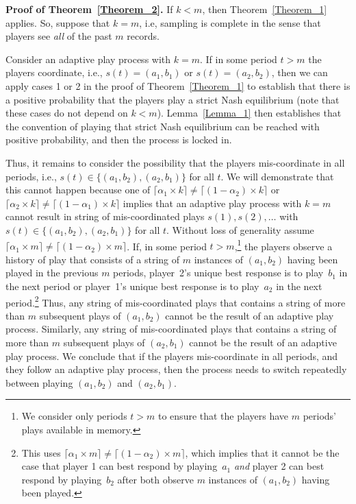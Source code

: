 \textbf{Proof of Theorem~\ref{Theorem_2}.}
If $k<m$, then Theorem~\ref{Theorem_1} applies. So, suppose that $k=m$, i.e, sampling is complete in the sense that players see \emph{all} of the past $m$ records.

Consider an adaptive play process with $k=m$. If in some period $t>m$ the players coordinate, i.e., $s(t)=(a_1,b_1)$ or $s(t)=(a_2,b_2)$, then we can apply cases 1 or 2 in the proof of Theorem~\ref{Theorem_1} to establish that there is a positive probability that the players play a strict Nash equilibrium (note that these cases do not depend on $k < m$). 
Lemma~\ref{Lemma_1} then establishes that the convention of playing that strict Nash equilibrium can be reached with positive probability, and then the process is locked in.

Thus, it remains to consider the possibility that the players mis-coordinate in all periods, i.e., $s(t)\in \{(a_1,b_2),(a_2,b_1)\}$ for all $t$. We will demonstrate that this cannot happen because one of $\lceil\alpha_1\times k\rceil \neq \lceil (1-\alpha_2)\times k\rceil$ or $\lceil\alpha_2\times k\rceil \neq \lceil (1-\alpha_1)\times k\rceil$ implies that an adaptive play process with $k=m$ cannot result in string of mis-coordinated plays $s(1),s(2), \ldots $ with $s(t)\in \{(a_1,b_2),(a_2,b_1)\}$ for all $t$. 
%
Without loss of generality assume $\lceil \alpha_1\times m\rceil \neq\lceil (1-\alpha_2)\times m\rceil$. If, in some period $t>m$,\footnote{We consider only periods $t>m$ to ensure that the players have $m$ periods' plays available in memory.} the players observe a history of play that consists of a string of $m$ instances of $(a_1,b_2)$ having been played in the previous $m$ periods, player~2's unique best response is to play~$b_1$ in the next period or player~1's unique best response is to play~$a_2$ in the next period.\footnote{This uses $\lceil \alpha_1\times m\rceil \neq\lceil (1-\alpha_2)\times m\rceil$, which implies that it cannot be the case that player 1 can best respond by playing~$a_1$ \emph{and} player 2 can best respond by playing~$b_2$ after both observe $m$ instances of $(a_1,b_2)$ having been played.} 
%
Thus, any string of mis-coordinated plays that contains a string of more than $m$ subsequent plays of $(a_1,b_2)$ cannot be the result of an adaptive play process. 
%
Similarly, any string of mis-coordinated plays that contains a string of more than $m$ subsequent plays of $(a_2,b_1)$ cannot be the result of an adaptive play process. 
%
We conclude that if the players mis-coordinate in all periods, and they follow an adaptive play process, then the process needs to switch repeatedly between playing $(a_1,b_2)$ and $(a_2,b_1)$. 

